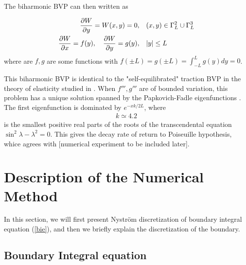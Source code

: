 \documentclass[10pt,twocolumn]{article}
\begin{document}
The biharmonic BVP can then written as 

\begin{align}
  \pdv{W}{y}(x,y) = W(x,y) = 0, \quad &(x,y) \in \Gamma_L^2 \cup \Gamma_L^3 \\
  \pdv{W}{x}(0,y) = f(y),\quad \pdv{W}{y}(0,y) = g(y), \quad &|y| \le L
\end{align}
where are $f,g$ are some functions with $f(\pm L) = g(\pm L) = \int_{-L}^L g(y)dy = 0$. 


This biharmonic BVP is identical to the "self-equilibrated" traction BVP in the theory of elasticity studied in
\cite{gregoryTractionBoundaryValue1980,horganDECAYESTIMATESBIHARMONIC1989,coRecentDevelopmentsConcerning1983}. 
When $f''',g'''$ are of bounded variation, 
this problem has a unique solution spanned by the Papkovich-Fadle eigenfunctions \cite{gregoryTractionBoundaryValue1980}.
The first eigenfunction is dominated by $e^{-xk/2L}$, where 
\begin{align*}
  k \simeq 4.2 
\end{align*}
is the smallest positive real parts of the roots 
of the transcendental equation $\sin^2\lambda - \lambda^2=0$. 
This gives the decay rate of return to Poiseuille hypothesis, whice agrees with [numerical experiment to be included later]. 


\section{Description of the Numerical Method\label{sec:numericalmethod}}
In this section, we will first present Nystr\"om discretization of boundary integral equation (\ref{bie}), and then we briefly explain the discretization of the boundary. 

\subsection{Boundary Integral equation}
\end{document}
